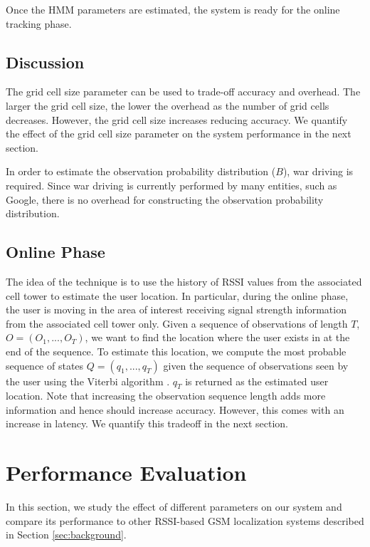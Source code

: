 \documentclass[conference]{IEEEtran}
\begin{document}
Once the HMM parameters are estimated, the system is ready for the
online tracking phase.

\subsection{Discussion}
The grid cell size parameter can be used to trade-off accuracy and
overhead. The larger the grid cell size, the lower the overhead as
the number of grid cells decreases. However, the grid cell size
increases reducing accuracy. We quantify the effect of the grid cell
size parameter on the system performance in the next section.

In order to estimate the observation probability distribution ($B$),
war driving is required. Since war driving is currently performed by
many entities, such as Google, there is no overhead for constructing
the observation probability distribution.
\subsection{Online Phase}
The idea of the technique is to use the history of RSSI values from
the associated cell tower to estimate the user location. In
particular, during the online phase, the user is moving in the area
of interest receiving signal strength information from the
associated cell tower only. Given a sequence of observations of
length $T$, $O = (O_1, ..., O_T)$, we want to find the location
where the user exists in at the end of the sequence. To estimate
this location, we compute the most probable sequence of states $Q=
(q_1, ..., q_T)$ given the sequence of observations seen by the user
using the Viterbi algorithm \cite{viterbi}. $q_T$ is returned as the
estimated user location. Note that increasing the observation
sequence length adds more information and hence should increase
accuracy. However, this comes with an increase in latency. We
quantify this tradeoff in the next section.



\section{Performance Evaluation}\label{results}
In this section, we study the effect of different parameters on our
system and compare its performance to other RSSI-based GSM
localization systems described in Section \ref{sec:background}.
\end{document}
